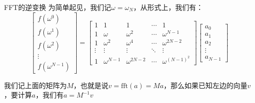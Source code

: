 \documentclass{beamer}
\begin{document}
\begin{frame}{FFT的逆变换}
    为简单起见，我们记$\omega=\omega_N$，从形式上，我们有：
    \begin{equation*}
        \begin{bmatrix}
            f(\omega^0)\\
            f(\omega^1)\\
            f(\omega^2)\\
            \vdots\\
            f(\omega^{N-1})
        \end{bmatrix}=
        \begin{bmatrix}
            1 & 1 & 1 & \cdots & 1\\
            1 & \omega & \omega^2 & \cdots & \omega^{N-1}\\
            1 & \omega^2 & \omega^4 & \cdots & \omega^{2N-2}\\
            \vdots & \vdots & \vdots & \ddots & \vdots \\
            1 & \omega^{N-1} & \omega^{2N-2} & \cdots & \omega^{(N-1)^2}
        \end{bmatrix}
        \begin{bmatrix}
            a_0\\
            a_1\\
            a_2\\
            \vdots\\
            a_{N-1}
        \end{bmatrix}
    \end{equation*}

    我们记上面的矩阵为$M$，也就是说$v=\text{fft}(a)=Ma$，那么如果已知左边的向量$v$，要计算$a$，我们有$a=M^{-1}v$
\end{frame}
\end{document}
